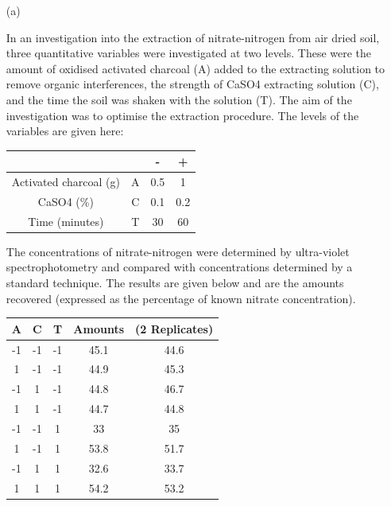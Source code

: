 \documentclass[a4paper,12pt]{article}
\begin{document}
\begin{itemize} %
	\item[(a)] %
	
	In an investigation into the extraction of nitrate-nitrogen from air dried soil, three quantitative variables were investigated at two levels. These were the amount of oxidised activated charcoal (A) added to the extracting solution to remove organic interferences, the strength of CaSO4 extracting solution (C), and the time the soil was shaken with the solution (T). The aim of the investigation was to optimise the extraction procedure. The levels of the variables are given here:
	\begin{center}
		{
			\large
			\begin{tabular}{|cc|c|c|}
				\hline	&		&\phantom{sp}	{\LARGE -}\phantom{sp}	&	\phantom{sp} {\LARGE +} \phantom{sp}	\\ \hline
				Activated charcoal (g) 	&	A 	&	0.5	&	1	\\ \hline
				CaSO{4} (\%) 	&	C 	&	0.1	&	0.2	\\ \hline
				Time (minutes) 	&	T 	&	30	&	60	\\ \hline
			\end{tabular} 
		}
	\end{center}
	
	The concentrations of nitrate-nitrogen were determined by ultra-violet spectrophotometry and compared with concentrations determined by a standard technique. The results are given below and are the amounts recovered (expressed as the percentage of known nitrate concentration).
	{
		\large
		\begin{center}
			\begin{tabular}{|c|c|c|cc|}
				\hline
				\phantom{sp}A\phantom{sp}	&	\phantom{sp}C\phantom{sp}	&\phantom{sp}	T\phantom{sp}	&	Amounts&	(2 Replicates)	\\
				\hline
				-1	&	-1	&	-1	&	45.1	&	44.6	\\ \hline
				
				1	&	-1	&	-1	&	44.9	&	45.3	\\ \hline
				
				-1	&	1	&	-1	&	44.8	&	46.7	\\ \hline
				
				1	&	1	&	-1	&	44.7	&	44.8	\\ \hline
				
				-1	&	-1	&	1	&	33	&	35	\\ \hline
				
				1	&	-1	&	1	&	53.8	&	51.7	\\ \hline
				
				-1	&	1	&	1	&	32.6	&	33.7	\\ \hline							
				1	&	1	&	1	&	54.2	&	53.2	\\ \hline
			\end{tabular}
		\end{center}
	}
\end{itemize}
\end{document}
